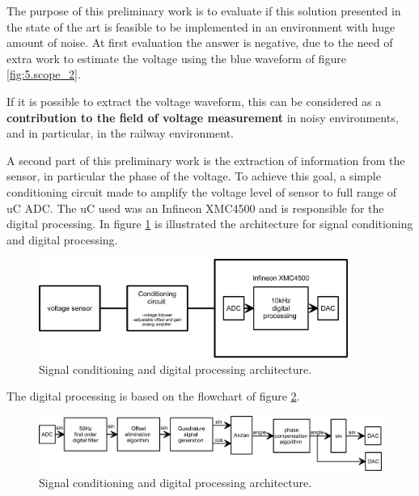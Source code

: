 	The purpose of this preliminary work is to evaluate if this solution presented in the state of the art is feasible to be implemented in an environment with huge amount of noise. At first evaluation the answer is negative, due to the need of extra work to estimate the voltage using the blue waveform of figure \ref{fig:5.scope_2}.
	
	
	If it is possible to extract the voltage waveform, this can be considered as a \textbf{contribution to the field of voltage measurement} in noisy environments, and in particular, in the railway environment.

	A second part of this preliminary work is the extraction of information from the sensor, in particular the phase of the voltage. To achieve this goal, a simple conditioning circuit made to amplify the voltage level of sensor to full range of uC ADC. The uC used was an Infineon XMC4500 and is responsible for the digital processing. In figure \ref{fig:5.generalArchitecture} is illustrated the architecture for signal conditioning and digital processing.
	
	\begin{figure}[h!]
		\centering
		\includegraphics[width=0.9\textwidth,keepaspectratio]{figures/5.PreliminaryW/generalArchitecture}
		\caption{Signal conditioning and digital processing architecture.}
		\label{fig:5.generalArchitecture}
	\end{figure}

	The digital processing is based on the flowchart of figure \ref{fig:5.processingArchitecture}.
	
	\begin{figure}[h!]
		\centering
		\includegraphics[width=\textwidth,keepaspectratio]{figures/5.PreliminaryW/processingArchitecture}
		\caption{Signal conditioning and digital processing architecture.}
		\label{fig:5.processingArchitecture}
	\end{figure}

